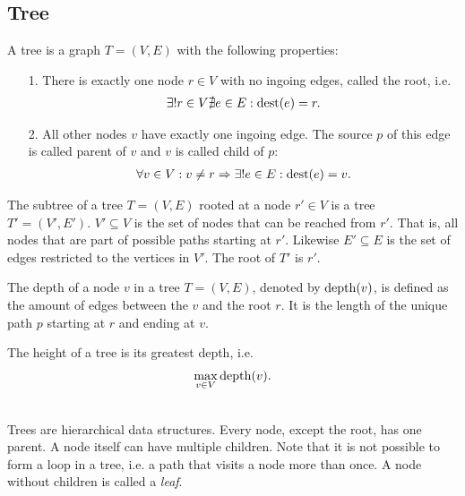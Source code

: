 \subsection{Tree}
	\begin{mydef}\label{tree}
		A \textnormal{tree} is a graph $T = (V, E)$ with the following properties:
		\begin{itemize}
			\item[1.] There is exactly one node $r \in V$ with no ingoing edges, called the \textnormal{root}, i.e.
				\begin{align*}
					\exists! r \in V \nexists e \in E : \operatorname{dest}(e) = r.
				\end{align*}
			\item[2.] All other nodes $v$ have exactly one ingoing edge. The source $p$ of this edge is called \textnormal{parent} of $v$ and
				$v$ is called \textnormal{child} of $p$:
				\begin{align*}
					\forall v \in V : v \neq r \Rightarrow \exists! e \in E : \operatorname{dest}(e) = v.
				\end{align*}
		\end{itemize}
	\end{mydef}
	\begin{mydef}\label{subTree}
		The \textnormal{subtree} of a tree $T = (V, E)$ rooted at a node $r' \in V$ is a tree $T' = (V', E')$. $V' \subseteq V$ is the set
		of nodes that can be reached from $r'$. That is, all nodes that are part of possible paths starting at $r'$.
		Likewise $E' \subseteq E$ is the set of edges restricted to the vertices in $V'$. The root of $T'$ is $r'$.
	\end{mydef}
	\begin{mydef}\label{treeDepth}
		The \textnormal{depth} of a node $v$ in a tree $T = (V, E)$, denoted by $\operatorname{depth}(v)$, is defined as the amount of
		edges between the $v$ and the root $r$. It is the length of the unique path $p$ starting at $r$ and ending at $v$.
		
		The \textnormal{height} of a tree is its greatest depth, i.e.
		\begin{align*}
			\max_{v \in V} \operatorname{depth}(v).
		\end{align*}
	\end{mydef}\quad\\
	Trees are hierarchical data structures. Every node, except the root, has one parent. A node itself can have multiple children.
	Note that it is not possible to form a loop in a tree, i.e. a path that visits a node more than once. A node without
	children is called a \textit{leaf}.


